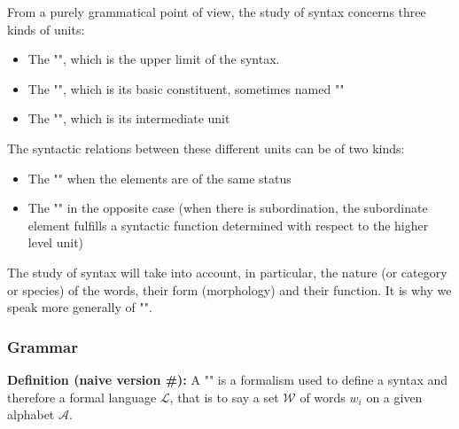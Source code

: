 	From a purely grammatical point of view, the study of syntax concerns three kinds of units:
	\begin{itemize}
		\item The "", which is the upper limit of the syntax.

		\item The "", which is its basic constituent, sometimes named ""

		\item The "", which is its intermediate unit
	\end{itemize}
	The syntactic relations between these different units can be of two kinds:
	\begin{itemize}
		\item The "" when the elements are of the same status

		\item The "" in the opposite case (when there is subordination, the subordinate element fulfills a syntactic function determined with respect to the higher level unit)
	\end{itemize}
	The study of syntax will take into account, in particular, the nature (or category or species) of the words, their form (morphology) and their function. It is why we speak more generally of "".
	
	\subsubsection{Grammar}
	\textbf{Definition (naive version \#\mydef):} A "" is a formalism used to define a syntax and therefore a formal language $\mathcal{L}$, that is to say a set $\mathcal{W}$ of words $w_i$ on a given alphabet $\mathcal{A}$.
	
